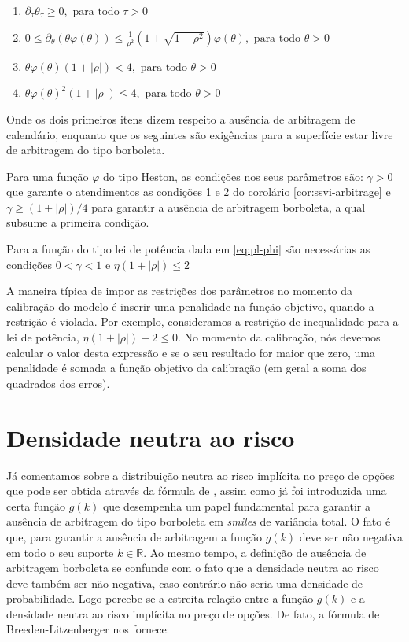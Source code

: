 \documentclass[]{book}
\providecommand{\tightlist}{%
  \setlength{\itemsep}{0pt}\setlength{\parskip}{0pt}}
\theoremstyle{definition}
\theoremstyle{definition}
\theoremstyle{definition}
\theoremstyle{remark}
\begin{document}
\begin{enumerate}
\def\labelenumi{\arabic{enumi}.}
\tightlist
\item
  \(\partial_\tau\theta_\tau\geq 0, \text{ para todo } \tau > 0\)
\item
  \(0\leq \partial_\theta(\theta\varphi(\theta))\leq\frac{1}{\rho^2}\left(1+\sqrt{1-\rho^2}\right)\varphi(\theta), \text{ para todo } \theta>0\)
\item
  \(\theta\varphi(\theta)(1+|\rho|)<4, \text{ para todo } \theta>0\)
\item
  \(\theta\varphi(\theta)^2(1+|\rho|)\leq 4, \text{ para todo } \theta>0\)
\end{enumerate}

Onde os dois primeiros itens dizem respeito a ausência de arbitragem de calendário, enquanto que os seguintes são exigências para a superfície estar livre de arbitragem do tipo borboleta.

Para uma função \(\varphi\) do tipo Heston, as condições nos seus parâmetros são: \(\gamma>0\) que garante o atendimentos as condições 1 e 2 do corolário \ref{cor:ssvi-arbitrage} e \(\gamma\geq(1+|\rho|)/4\) para garantir a ausência de arbitragem borboleta, a qual subsume a primeira condição.

Para a função do tipo lei de potência dada em \eqref{eq:pl-phi} são necessárias as condições \(0<\gamma<1\) e \(\eta(1+|\rho|)\leq 2\)

A maneira típica de impor as restrições dos parâmetros no momento da calibração do modelo é inserir uma penalidade na função objetivo, quando a restrição é violada. Por exemplo, consideramos a restrição de inequalidade para a lei de potência, \(\eta(1+|\rho|)-2\leq 0\). No momento da calibração, nós devemos calcular o valor desta expressão e se o seu resultado for maior que zero, uma penalidade é somada a função objetivo da calibração (em geral a soma dos quadrados dos erros).

\hypertarget{densidade-neutra-ao-risco}{%
\section{Densidade neutra ao risco}\label{densidade-neutra-ao-risco}}

Já comentamos sobre a \protect\hyperlink{rnd}{distribuição neutra ao risco} implícita no preço de opções que pode ser obtida através da fórmula de \citep{Breeden1978}, assim como já foi introduzida uma certa função \protect\hyperlink{svi}{\(g(k)\)} que desempenha um papel fundamental para garantir a ausência de arbitragem do tipo borboleta em \emph{smiles} de variância total. O fato é que, para garantir a ausência de arbitragem a função \(g(k)\) deve ser não negativa em todo o seu suporte \(k \in \mathbb R\). Ao mesmo tempo, a definição de ausência de arbitragem borboleta se confunde com o fato que a densidade neutra ao risco deve também ser não negativa, caso contrário não seria uma densidade de probabilidade. Logo percebe-se a estreita relação entre a função \(g(k)\) e a densidade neutra ao risco implícita no preço de opções. De fato, a fórmula de Breeden-Litzenberger nos fornece:
\end{document}
